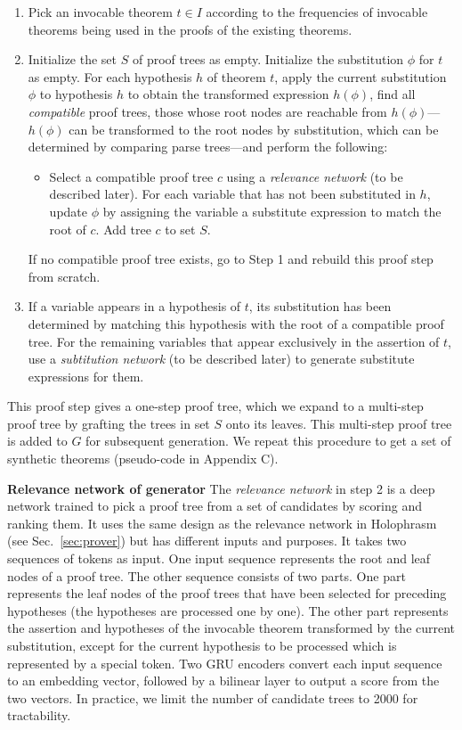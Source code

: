 \documentclass{article}
\begin{document}
\begin{enumerate}
	\item Pick an invocable theorem $t \in I$ according to the frequencies of invocable theorems being used in the proofs of the existing theorems.  
	\item Initialize the set $S$ of proof trees as empty. Initialize the substitution $\phi$ for $t$ as empty. For each hypothesis $h$ of theorem $t$, apply the current substitution $\phi$ to hypothesis $h$ to obtain the transformed expression $h(\phi)$, find all \emph{compatible} proof trees, those whose root nodes are reachable from $h(\phi)$---$h(\phi)$ can be transformed to the root nodes by substitution, which can be determined by comparing parse trees---and perform the following:
	\begin{itemize}
	    \item Select a compatible proof tree $c$ using a \emph{relevance network} (to be described later). For each variable that has not been substituted in $h$, update $\phi$ by assigning the variable a substitute expression to match the root of $c$. Add tree $c$ to set $S$. 
	\end{itemize}
	If no compatible proof tree exists, go to Step 1 and rebuild this proof step from scratch. 
	\item
	If a variable appears in a hypothesis of $t$, 
	its substitution has been determined by matching this hypothesis with the root of a compatible proof tree. 
	For the remaining variables that appear exclusively in the assertion of $t$, use a \emph{subtitution network} (to be described later) to generate substitute expressions for them. 
\end{enumerate}

This proof step gives a one-step proof tree, which we expand to a multi-step proof tree by grafting the trees in set $S$ onto its leaves. This multi-step proof tree is added to $G$ for subsequent generation.
We repeat this procedure to get a set of synthetic theorems 
(pseudo-code in Appendix C).

\noindent\textbf{Relevance network of generator}
The \emph{relevance network} in step 2 is a deep network trained to pick a proof tree from a set of candidates by scoring and ranking them. It uses the same design as the relevance network in Holophrasm~\cite{whalen2016holophrasm} (see Sec.~\ref{sec:prover}) but has different inputs and purposes. 
It takes two sequences of tokens as input.
One input sequence represents the root and leaf nodes of 
a proof tree.
The other sequence consists of two parts.
One part represents
the leaf nodes of the proof trees that have been selected for preceding hypotheses (the hypotheses are processed one by one).
The other part represents the assertion and hypotheses of the invocable theorem transformed by the current substitution, except for the current hypothesis to be processed which is represented by a special token. 
Two GRU encoders convert each input sequence to an embedding vector,
followed by a bilinear layer to output a score 
from the two vectors.
In practice, we limit the number of candidate trees to 2000 for tractability. 
\end{document}

